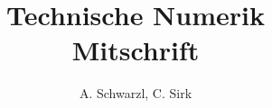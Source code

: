\documentclass[a4paper]{article}
\begin{document}
\title{Technische Numerik \\ Mitschrift}
\author{A. Schwarzl, C. Sirk}
\maketitle


\end{document}
